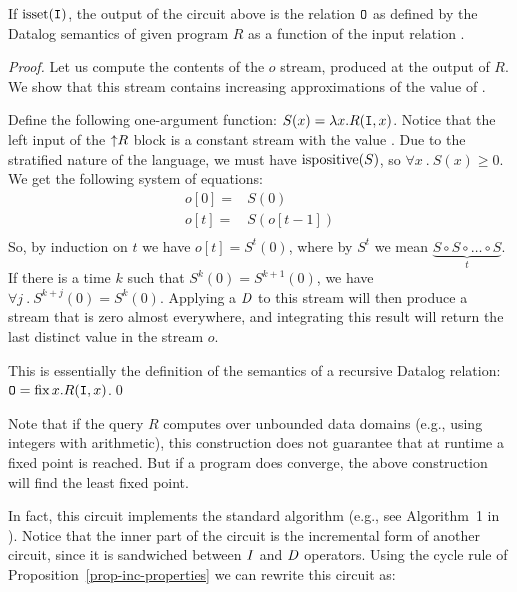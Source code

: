 \begin{theorem}\label{theorem:recursion}
If $\mbox{isset}(\mbox{\texttt{I}})$, the output of the circuit above is
the relation $\mbox{\texttt{O}}$ as defined by the Datalog semantics of given program
$R$ as a function of the input relation .
\end{theorem}
\begin{proof}\label{proof-recursion}
Let us compute the contents of the $o$ stream, produced at the output
of $R$.  We show that this stream contains increasing approximations of the value of .

Define the following one-argument function: $S(x) = \lambda x . R(\mbox{\texttt{I}}, x)$.
Notice that the left input of the ${\uparrow}R$ block is a constant stream
with the value .  Due to the stratified nature of the language,
we must have $\mbox{ispositive}(S)$, so $\forall x~.~S(x) \geq 0$.
We get the following system of equations:
$$
\begin{aligned}
o[0] =& S(0) \\
o[t] =& S(o[t-1]) \\
\end{aligned}
$$
So, by induction on $t$ we have $o[t] = S^t(0)$, where by
$S^t$ we mean $\underbrace{S \circ S \circ \ldots \circ S}_{t}$.
If there is a time $k$ such that $S^k(0) = S^{k+1}(0)$, we have
$\forall j~.~S^{k+j}(0) = S^k(0)$.  Applying a $\mathit{D}$ to this stream
will then produce a stream that is zero almost everywhere, and integrating
this result will return the last distinct value in the stream $o$.

This is essentially the definition of the semantics of a recursive Datalog relation:
$\mbox{\texttt{O}} = \mbox{fix}\,x.R(\mbox{\texttt{I}}, x)$.\qed
\end{proof}

Note that if the query $R$ computes over unbounded data domains (e.g.,
using integers with arithmetic), this construction does not guarantee
that at runtime a fixed point is reached.  But if a program does converge, the
above construction will find the least fixed point.

In fact, this circuit implements the standard 
algorithm (e.g., see Algorithm~1 in \cite{greco-sldm15}).
Notice that the inner part of the circuit is the incremental
form of another circuit, since it is sandwiched between $\mathit{I}$ and $\mathit{D}$ operators.
Using the cycle rule of Proposition~\ref{prop-inc-properties} we can rewrite this circuit as:
%
\begin{center}
\end{center}

